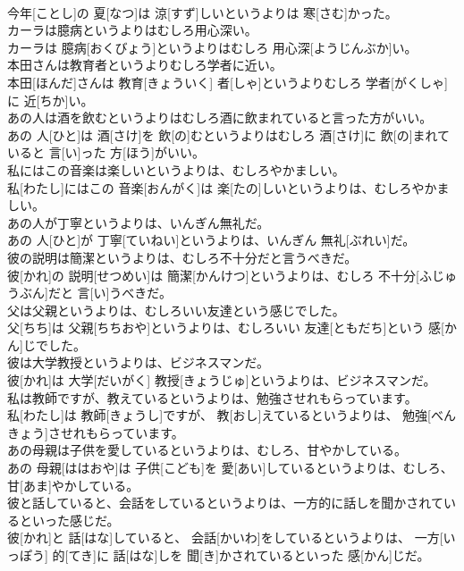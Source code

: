 \documentclass[8pt]{extreport}
\begin{document}
\begin{CJK}{UTF8}{min}
\\	今年[ことし]の 夏[なつ]は 涼[すず]しいというよりは 寒[さむ]かった。
\\	カーラは臆病というよりはむしろ用心深い。	
\\	カーラは 臆病[おくびょう]というよりはむしろ 用心深[ようじんぶか]い。
\\	本田さんは教育者というよりむしろ学者に近い。	
\\	本田[ほんだ]さんは 教育[きょういく] 者[しゃ]というよりむしろ 学者[がくしゃ]に 近[ちか]い。
\\	あの人は酒を飲むというよりはむしろ酒に飲まれていると言った方がいい。	
\\	あの 人[ひと]は 酒[さけ]を 飲[の]むというよりはむしろ 酒[さけ]に 飲[の]まれていると 言[い]った 方[ほう]がいい。
\\	私にはこの音楽は楽しいというよりは、むしろやかましい。	
\\	私[わたし]にはこの 音楽[おんがく]は 楽[たの]しいというよりは、むしろやかましい。
\\	あの人が丁寧というよりは、いんぎん無礼だ。	
\\	あの 人[ひと]が 丁寧[ていねい]というよりは、いんぎん 無礼[ぶれい]だ。
\\	彼の説明は簡潔というよりは、むしろ不十分だと言うべきだ。	
\\	彼[かれ]の 説明[せつめい]は 簡潔[かんけつ]というよりは、むしろ 不十分[ふじゅうぶん]だと 言[い]うべきだ。
\\	父は父親というよりは、むしろいい友達という感じでした。	
\\	父[ちち]は 父親[ちちおや]というよりは、むしろいい 友達[ともだち]という 感[かん]じでした。
\\	彼は大学教授というよりは、ビジネスマンだ。	
\\	彼[かれ]は 大学[だいがく] 教授[きょうじゅ]というよりは、ビジネスマンだ。
\\	私は教師ですが、教えているというよりは、勉強させれもらっています。	
\\	私[わたし]は 教師[きょうし]ですが、 教[おし]えているというよりは、 勉強[べんきょう]させれもらっています。
\\	あの母親は子供を愛しているというよりは、むしろ、甘やかしている。	
\\	あの 母親[ははおや]は 子供[こども]を 愛[あい]しているというよりは、むしろ、 甘[あま]やかしている。
\\	彼と話していると、会話をしているというよりは、一方的に話しを聞かされているといった感じだ。	
\\	彼[かれ]と 話[はな]していると、 会話[かいわ]をしているというよりは、 一方[いっぽう] 的[てき]に 話[はな]しを 聞[き]かされているといった 感[かん]じだ。

\end{CJK}
\end{document}
